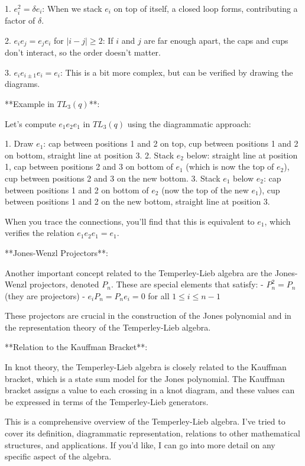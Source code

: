 \documentclass[12p]{article}
\newcounter{reasoningcounter}
\newenvironment{reasoning}[1][]
{\refstepcounter{reasoningcounter}%
\begin{tcolorbox}[
    title=Reasoning \thereasoningcounter: #1,
    colback=white, %
    colframe=gray,
    coltext=black, %
    fonttitle=\bfseries\normalsize,
    top=2mm,
    bottom=2mm,
    enlarge top initially by=5mm
]
\small
}
{\end{tcolorbox}}
\begin{document}
\begin{reasoning}
1. $e_i^2 = \delta e_i$: When we stack $e_i$ on top of itself, a closed loop forms, contributing a factor of $\delta$.

2. $e_i e_j = e_j e_i$ for $|i - j| \geq 2$: If $i$ and $j$ are far enough apart, the caps and cups don't interact, so the order doesn't matter.

3. $e_i e_{i\pm 1} e_i = e_i$: This is a bit more complex, but can be verified by drawing the diagrams.

**Example in $TL_3(q)$**:

Let's compute $e_1 e_2 e_1$ in $TL_3(q)$ using the diagrammatic approach:

1. Draw $e_1$: cap between positions 1 and 2 on top, cup between positions 1 and 2 on bottom, straight line at position 3.
2. Stack $e_2$ below: straight line at position 1, cap between positions 2 and 3 on bottom of $e_1$ (which is now the top of $e_2$), cup between positions 2 and 3 on the new bottom.
3. Stack $e_1$ below $e_2$: cap between positions 1 and 2 on bottom of $e_2$ (now the top of the new $e_1$), cup between positions 1 and 2 on the new bottom, straight line at position 3.

When you trace the connections, you'll find that this is equivalent to $e_1$, which verifies the relation $e_1 e_2 e_1 = e_1$.

**Jones-Wenzl Projectors**:

Another important concept related to the Temperley-Lieb algebra are the Jones-Wenzl projectors, denoted $P_n$. These are special elements that satisfy:
- $P_n^2 = P_n$ (they are projectors)
- $e_i P_n = P_n e_i = 0$ for all $1 \leq i \leq n-1$

These projectors are crucial in the construction of the Jones polynomial and in the representation theory of the Temperley-Lieb algebra.

**Relation to the Kauffman Bracket**:

In knot theory, the Temperley-Lieb algebra is closely related to the Kauffman bracket, which is a state sum model for the Jones polynomial. The Kauffman bracket assigns a value to each crossing in a knot diagram, and these values can be expressed in terms of the Temperley-Lieb generators.

This is a comprehensive overview of the Temperley-Lieb algebra. I've tried to cover its definition, diagrammatic representation, relations to other mathematical structures, and applications. If you'd like, I can go into more detail on any specific aspect of the algebra.
\end{reasoning}
\end{document}
